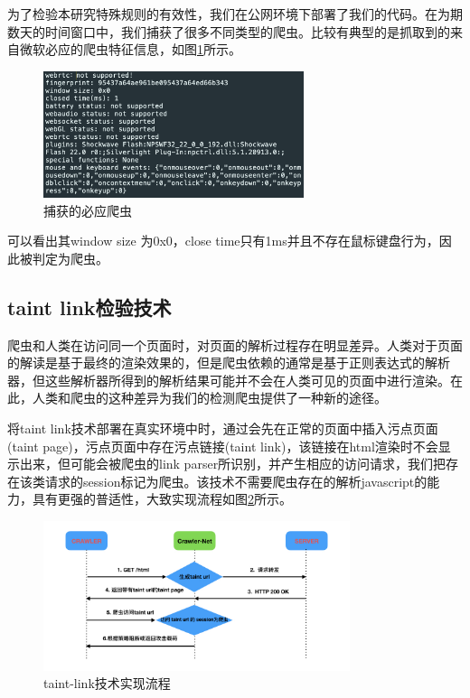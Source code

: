 \documentclass[doctor,privacy,twoside]{buaa_mac}
\begin{document}
为了检验本研究特殊规则的有效性，我们在公网环境下部署了我们的代码。在为期数天的时间窗口中，我们捕获了很多不同类型的爬虫。比较有典型的是抓取到的来自微软必应的爬虫特征信息，如图\ref{fig:bing}所示。


\begin{figure}[!h]
  \centering
  \includegraphics[width=0.68\textwidth]{images/bing_crawler.png}
  \caption{捕获的必应爬虫}
  \label{fig:bing}
\end{figure}


可以看出其window size 为0x0，close time只有1ms并且不存在鼠标键盘行为，因此被判定为爬虫。


\subsection{taint link检验技术}
爬虫和人类在访问同一个页面时，对页面的解析过程存在明显差异。人类对于页面的解读是基于最终的渲染效果的，但是爬虫依赖的通常是基于正则表达式的解析器，但这些解析器所得到的解析结果可能并不会在人类可见的页面中进行渲染。在此，人类和爬虫的这种差异为我们的检测爬虫提供了一种新的途径。

将taint link技术部署在真实环境中时，通过会先在正常的页面中插入污点页面(taint page)，污点页面中存在污点链接(taint link)，该链接在html渲染时不会显示出来，但可能会被爬虫的link parser所识别，并产生相应的访问请求，我们把存在该类请求的session标记为爬虫。该技术不需要爬虫存在的解析javascript的能力，具有更强的普适性，大致实现流程如图\ref{fig:taint}所示。

\begin{figure}[!h]
  \centering
  \includegraphics[width=0.8\textwidth]{images/architecture/architecture003.jpeg}
  \caption{taint-link技术实现流程}
  \label{fig:taint}
\end{figure}
\end{document}

